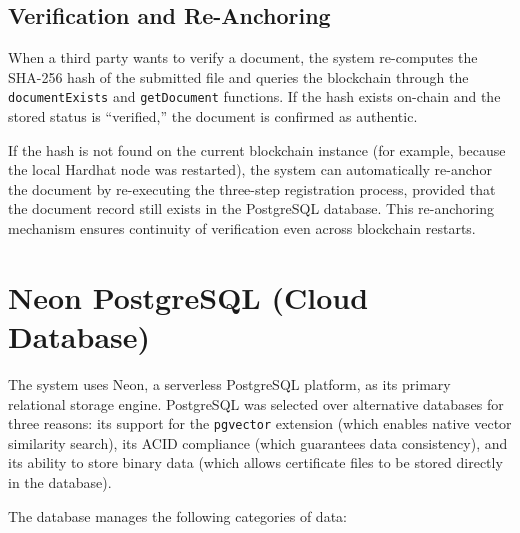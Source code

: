         \subsection{Verification and Re-Anchoring}
        \label{sec:verification_reanchroing}

            When a third party wants to verify a document, the system re-computes the SHA-256 hash of the submitted file and queries the blockchain through the \texttt{documentExists} and \texttt{getDocument} functions. If the hash exists on-chain and the stored status is ``verified,'' the document is confirmed as authentic.
            
            If the hash is not found on the current blockchain instance (for example, because the local Hardhat node was restarted), the system can automatically re-anchor the document by re-executing the three-step registration process, provided that the document record still exists in the PostgreSQL database. This re-anchoring mechanism ensures continuity of verification even across blockchain restarts.
            
            \section{Neon PostgreSQL (Cloud Database)}
            \label{sec:Neon_database}
            
            The system uses Neon, a serverless PostgreSQL platform, as its primary relational storage engine. PostgreSQL was selected over alternative databases for three reasons: its support for the \texttt{pgvector} extension (which enables native vector similarity search), its ACID compliance (which guarantees data consistency), and its ability to store binary data (which allows certificate files to be stored directly in the database).
            
            The database manages the following categories of data:
            
